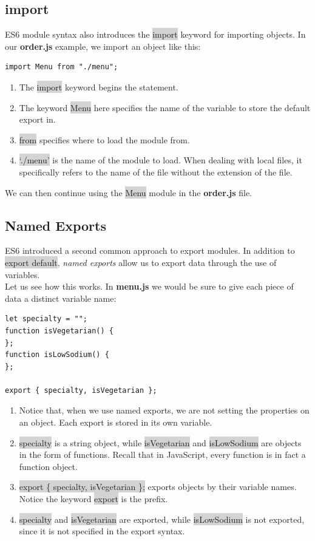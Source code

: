 \documentclass[11pt]{article}
\begin{document}
\subsection{import}
ES6 module syntax also introduces the \colorbox{lightgray}{import} keyword for importing objects. In our \textbf{order.js} example, we import an object like this:
\begin{lstlisting}
import Menu from "./menu";
\end{lstlisting}
\begin{enumerate}[leftmargin = *]
\item The \colorbox{lightgray}{import} keyword begins the statement.
\item The keyword \colorbox{lightgray}{Menu} here specifies the name of the variable to store the default export in.
\item \colorbox{lightgray}{from} specifies where to load the module from.
\item \colorbox{lightgray}{`./menu'} is the name of the module to load. When dealing with local files, it specifically refers to the name of the file without the extension of the file.
\end{enumerate}
We can then continue using the \colorbox{lightgray}{Menu} module in the \textbf{order.js} file.

\subsection{Named Exports}
ES6 introduced a second common approach to export modules. In addition to \colorbox{lightgray}{export default}, \textit{named exports} allow us to export data through the use of variables. \\
\newline
Let us see how this works. In \textbf{menu.js} we would be sure to give each piece of data a distinct variable name:
\begin{lstlisting}
let specialty = "";
function isVegetarian() {
}; 
function isLowSodium() {
}; 

export { specialty, isVegetarian };
\end{lstlisting}
\begin{enumerate}[leftmargin = *]
\item Notice that, when we use named exports, we are not setting the properties on an object. Each export is stored in its own variable.
\item \colorbox{lightgray}{specialty} is a string object, while \colorbox{lightgray}{isVegetarian} and \colorbox{lightgray}{isLowSodium} are objects in the form of functions. Recall that in JavaScript, every function is in fact a function object.
\item \colorbox{lightgray}{export \{ specialty, isVegetarian \};} exports objects by their variable names. Notice the keyword \colorbox{lightgray}{export} is the prefix.
\item \colorbox{lightgray}{specialty} and \colorbox{lightgray}{isVegetarian} are exported, while \colorbox{lightgray}{isLowSodium} is not exported, since it is not specified in the export syntax.
\end{enumerate}
\end{document}
